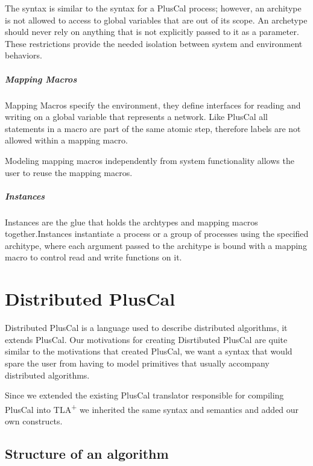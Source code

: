 \documentclass{thesul}
\newcommand{\tlaplus}{TLA\textsuperscript{+}\xspace}
\begin{document}
The syntax is similar to the syntax for a PlusCal process; however, an architype is not allowed to access to global variables that are out of its scope. An archetype should never rely on anything that is not explicitly passed to it as a parameter. These restrictions provide the needed isolation between system and environment behaviors.

\paragraph{Mapping Macros}

Mapping Macros specify the environment, they define interfaces for reading and writing on a global variable that represents a network. Like PlusCal all statements in a macro are part of the same atomic step, therefore labels are not allowed within a mapping macro.

Modeling mapping macros independently from system functionality allows the user to reuse the mapping macros.

\paragraph{Instances}

Instances are the glue that holds the archtypes and mapping macros together.Instances instantiate a process or a group of processes using the specified architype, where each argument passed to the architype is bound with a mapping macro to control read and write functions on it.


\chapter{Distributed PlusCal}

Distributed PlusCal is a language used to describe distributed algorithms, it extends PlusCal. 
Our motivations for creating Disrtibuted PlusCal are quite similar to the motivations that created PlusCal, we want a syntax that would spare the user from having to model primitives that usually accompany distributed algorithms.

Since we extended the existing PlusCal translator responsible for compiling PlusCal into \tlaplus we inherited the same syntax and semantics and added our own constructs.

\section{Structure of an algorithm}
\end{document}
